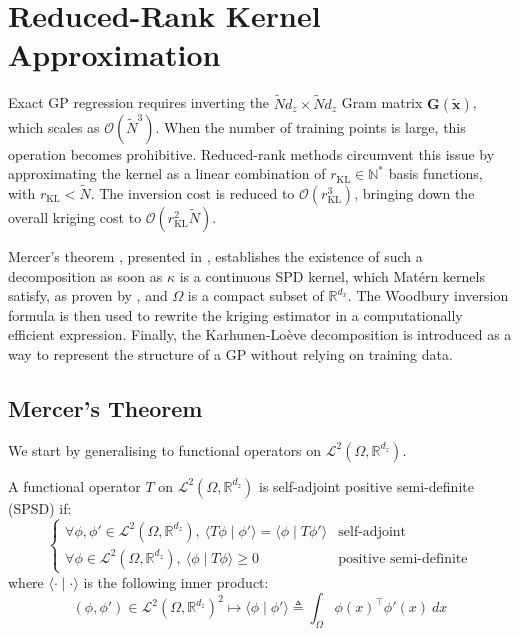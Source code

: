 \section{Reduced-Rank Kernel Approximation}\label{sec:reduced_rank}

Exact GP regression requires inverting the $\tilde{N}d_z\times\tilde{N}d_z$ Gram matrix $\mathbf{G}(\tilde{\mathbf{x}})$, which scales as $\mathcal{O}\left(\tilde{N}^3\right)$. When the number of training points is large, this operation becomes prohibitive. Reduced-rank methods \cite{bib:Nystrom,bib:inducing-points} circumvent this issue by approximating the kernel as a linear combination of $r_{\mathrm{KL}}\in\mathbb{N}^*$ basis functions, with $r_{\mathrm{KL}}<\tilde{N}$. The inversion cost is reduced to $\mathcal{O}\left(r_{\mathrm{KL}}^3\right)$, bringing down the overall kriging cost to $\mathcal{O}\left(r_{\mathrm{KL}}^2\tilde{N}\right)$.

Mercer's theorem \cite{bib:Mercer}, presented in , establishes the existence of such a decomposition as soon as $\kappa$ is a continuous SPD kernel, which Matérn kernels satisfy, as proven by , and $\Omega$ is a compact subset of $\mathbb{R}^{d_x}$. The Woodbury inversion formula is then used to rewrite the kriging estimator in a computationally efficient expression. Finally, the Karhunen-Loève decomposition is introduced as a way to represent the structure of a GP without relying on training data.

\subsection{Mercer's Theorem}\label{sec:Mercer}

We start by generalising  to functional operators on $\mathcal{L}^2(\Omega,\mathbb{R}^{d_z})$.

\begin{definition}
	A functional operator $T$ on $\mathcal{L}^2(\Omega,\mathbb{R}^{d_z})$ is self-adjoint positive semi-definite (SPSD) if:
	\begin{equation}
		\left\{\begin{array}{ll}
		\forall\phi,\phi'\in\mathcal{L}^2(\Omega,\mathbb{R}^{d_z}),\:\langle T\phi\mid\phi'\rangle=\langle\phi\mid T\phi'\rangle&\text{self-adjoint}\\
		\forall\phi\in\mathcal{L}^2(\Omega,\mathbb{R}^{d_z}),\:\langle\phi\mid T\phi\rangle\geq0&\text{positive semi-definite}
		\end{array}\right.
	\end{equation}
	where $\langle\cdot\mid\cdot\rangle$ is the following inner product:
	\begin{equation}
		(\phi,\phi')\in\mathcal{L}^2(\Omega,\mathbb{R}^{d_z})^2\mapsto\langle\phi\mid\phi'\rangle\triangleq\int_{\Omega}{\phi(x)^\top\phi'(x)\:dx}
	\end{equation}
\end{definition}

